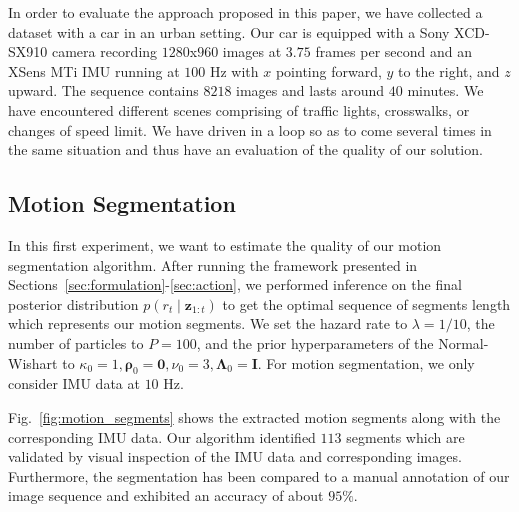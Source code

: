 In order to evaluate the approach proposed in this paper, we have collected
a dataset with a car in an urban setting. Our car is equipped with a Sony
XCD-SX910 camera recording $1280$x$960$ images at $3.75$ frames per second and
an XSens MTi IMU running at $100$ Hz with $x$ pointing forward, $y$ to the
right, and $z$ upward. The sequence contains $8218$ images and lasts around $40$
minutes. We have encountered different scenes comprising of traffic lights,
crosswalks, or changes of speed limit. We have driven in a loop so as to come
several times in the same situation and thus have an evaluation of the quality
of our solution.

\subsection{Motion Segmentation}
In this first experiment, we want to estimate the quality of our motion
segmentation algorithm. After running the framework presented in
Sections~\ref{sec:formulation}-\ref{sec:action}, we performed inference on the
final posterior distribution $p(r_t\mid \mathbf{z}_{1:t})$ to get the optimal
sequence of segments length which represents our motion segments. We set the
hazard rate to $\lambda=1/10$, the number of particles to $P=100$, and the prior
hyperparameters of the Normal-Wishart to $\kappa_0=1,
\boldsymbol{\rho}_0=\mathbf{0},\nu_0=3,\boldsymbol{\Lambda}_0=\mathbf{I}$. For
motion segmentation, we only consider IMU data at $10$ Hz.

Fig.~\ref{fig:motion_segments} shows the extracted motion segments along with
the corresponding IMU data. Our algorithm identified $113$ segments which are
validated by visual inspection of the IMU data and corresponding images.
Furthermore, the segmentation has been compared to a manual annotation of our
image sequence and exhibited an accuracy of about $95\%$.

